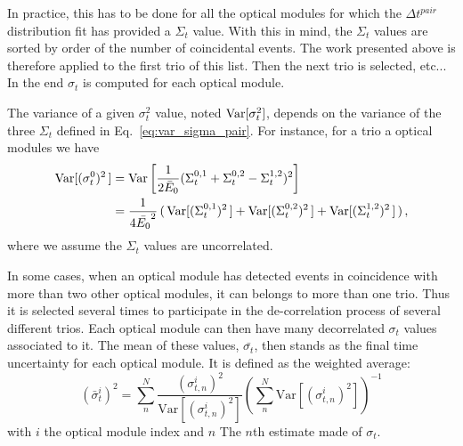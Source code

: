 In practice, this has to be done for all the optical modules for which the $\Delta {t}^{pair}$ distribution fit has provided a $\Sigma_{t}$ value.
With this in mind, the $\Sigma_{t}$ values are sorted by order of the number of coincidental events.
The work presented above is therefore applied to the first trio of this list.
Then the next trio is selected, etc...
In the end $\sigma_{t}$ is computed for each optical module.

The variance of a given $\sigma_{t}^{2}$ value, noted $\mathrm{Var}[\sigma_{t}^{2}]$, depends on the variance of the three $\Sigma_{t}$ defined in Eq.~\eqref{eq:var_sigma_pair}.
For instance, for a trio a optical modules we have
\begin{align}
  \mathrm{Var}[(\sigma_{t}^{0})^{2}\,] &= \mathrm{Var} \left[ \frac{1}{2\bar{E}_{0}} (\Sigma_{t}^{0,1}+\Sigma_{t}^{0,2}-\Sigma_{t}^{1,2})^{2} \right] \\
  &= \frac{1}{4\bar{E_{0}}^{2}}\, (\,\mathrm{Var}[(\Sigma_{t}^{0,1})^{2}\,]+\mathrm{Var}[(\Sigma_{t}^{0,2})^{2}\,]+\mathrm{Var}[(\Sigma_{t}^{1,2})^{2}\,]\,)\,,
\end{align}
where we assume the $\Sigma_{t}$ values are uncorrelated.

In some cases, when an optical module has detected events in coincidence with more than two other optical modules, it can belongs to more than one trio.
Thus it is selected several times to participate in the de-correlation process of several different trios.
Each optical module can then have many decorrelated $\sigma_{t}$ values associated to it.
The mean of these values, $\bar{\sigma_{t}}$, then stands as the final time uncertainty for each optical module.
It is defined as the weighted average:
\begin{equation}
  \displaystyle
 (\bar\sigma^i_{t})^2 = \sum_n^N  \dfrac{(\sigma^i_{t, n})^2}{\text{Var}[(\sigma^i_{t, n})^2]} \left(\sum_n^N \text{Var}[(\sigma^i_{t, n})^2]\right)^{-1}
\end{equation}
with $i$ the optical module index and $n$ The $n$th estimate made of $\sigma_{t}$.

